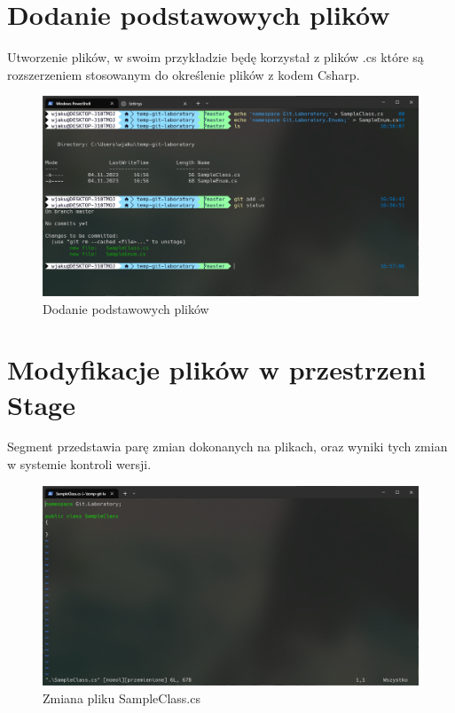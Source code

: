 \documentclass{article}
\begin{document}
\section{Dodanie podstawowych plików}

Utworzenie plików, w swoim przykładzie będę korzystał z plików .cs które są rozszerzeniem stosowanym do określenie plików z kodem Csharp.

\vspace*{\fill}
\begin{figure}[!h]
    \caption{Dodanie podstawowych plików}
    \centerline{\includegraphics [scale=0.5]{files-initialization.PNG}}
    \label{fig:label}
\end{figure}
\vspace*{\fill}
\newpage

\section{Modyfikacje plików w przestrzeni Stage}

Segment przedstawia parę zmian dokonanych na plikach, oraz wyniki tych zmian w systemie kontroli wersji.

\vspace*{\fill}
\begin{figure}[!h]
    \caption{Zmiana pliku SampleClass.cs }
    \centerline{\includegraphics [scale=0.5]{smapleClass-CHange.PNG}}
    \label{fig:label}
\end{figure}
\vspace*{\fill}
\newpage
\end{document}
